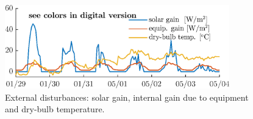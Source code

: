 \begin{figure}[t!]
	\begin{center}
	\vspace{1.1cm}
	\includegraphics[width=23pc]{figures/disturbances.eps}
	\caption{External disturbances: solar gain, internal gain due to equipment and dry-bulb temperature.}
	\label{F:dist}
\end{center}
\end{figure}
